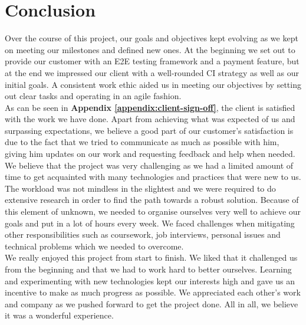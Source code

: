 \chapter{Conclusion}
\label{chap:conclusion}

Over the course of this project, our goals and objectives kept evolving as we kept on meeting our milestones and defined new ones. At the beginning we set out to provide our customer with an E2E testing framework and a payment feature, but at the end we impressed our client with a well-rounded CI strategy as well as our initial goals. A consistent work ethic aided us in meeting our objectives by setting out clear tasks and operating in an agile fashion.\\

As can be seen in \textbf{Appendix \ref{appendix:client-sign-off}}, the client is satisfied with the work we have done. Apart from achieving what was expected of us and surpassing expectations, we believe a good part of our customer's satisfaction is due to the fact that we tried to communicate as much as possible with him, giving him updates on our work and requesting feedback and help when needed.\\

We believe that the project was very challenging as we had a limited amount of time to get acquainted with many technologies and practices that were new to us. The workload was not mindless in the slightest and we were required to do extensive research in order to find the path towards a robust solution. Because of this element of unknown, we needed to organise ourselves very well to achieve our goals and put in a lot of hours every week. We faced challenges when mitigating other responsibilities such as coursework, job interviews, personal issues and technical problems which we needed to overcome.\\

We really enjoyed this project from start to finish. We liked that it challenged us from the beginning and that we had to work hard to better ourselves. Learning and experimenting with new technologies kept our interests high and gave us an incentive to make as much progress as possible. We appreciated each other's work and company as we pushed forward to get the project done. All in all, we believe it was a wonderful experience.
